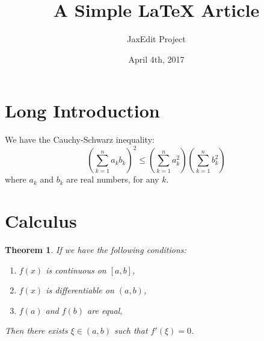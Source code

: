 \documentclass{report}
\author{JaxEdit Project}
\title{A Simple LaTeX Article}
\date{April 4th, 2017}
\newtheorem{thm}{Theorem}
\begin{document}
\maketitle

\tableofcontents

\section[Introduction]{Long Introduction}

We have the Cauchy-Schwarz inequality:
  \[ \left( \sum_{k=1}^n a_k b_k \right)^2 \leq \left( \sum_{k=1}^n a_k^2 \right) \left( \sum_{k=1}^n b_k^2 \right) \]
where $a_k$ and $b_k$ are real numbers, for any $k$.


\section{Calculus}

\begin{thm}
If we have the following conditions:
\begin{enumerate}
\item $f(x)$ is continuous on $[a,b]$,
\item $f(x)$ is differentiable on $(a,b)$,
\item $f(a)$ and $f(b)$ are equal,
\end{enumerate}
Then there exists $\xi\in(a,b)$ such that $f'(\xi)=0$.
\end{thm}
\end{document}
